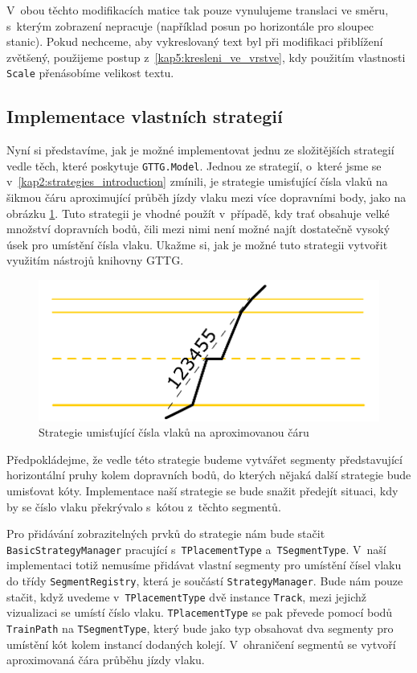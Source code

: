 V~obou těchto modifikacích matice tak pouze vynulujeme translaci ve směru, s~kterým zobrazení nepracuje (například posun po horizontále pro sloupec stanic). Pokud nechceme, aby vykreslovaný text byl při modifikaci přiblížení zvětšený, použijeme postup z~\ref{kap5:kresleni_ve_vrstve}, kdy použitím vlastnosti \texttt{Scale} přenásobíme velikost textu.

\subsection*{Implementace vlastních strategií}
Nyní si představíme, jak je možné implementovat jednu ze složitějších strategií vedle těch, které poskytuje \texttt{GTTG.Model}. Jednou ze strategií, o~které jsme se v~\ref{kap2:strategies_introduction} zmínili, je strategie umisťující čísla vlaků na šikmou čáru aproximující průběh jízdy vlaku mezi více dopravními body, jako na obrázku \ref{fig:kap5:strategy_aproximation}. Tuto strategii je vhodné použít v~případě, kdy trať obsahuje velké množství dopravních bodů, čili mezi nimi není možné najít dostatečně vysoký úsek pro umístění čísla vlaku. Ukažme si, jak je možné tuto strategii vytvořit využitím nástrojů knihovny GTTG.

\begin{figure}[!hbt]
	\centering
	\includegraphics[width=\textwidth]{../img/kap5_approx_line}
	\caption{Strategie umisťující čísla vlaků na aproximovanou čáru}
	\label{fig:kap5:strategy_aproximation}
\end{figure}

Předpokládejme, že vedle této strategie budeme vytvářet segmenty představující horizontální pruhy kolem dopravních bodů, do kterých nějaká další strategie bude umisťovat kóty. Implementace naší strategie se bude snažit předejít situaci, kdy by se číslo vlaku překrývalo s~kótou z~těchto segmentů.

Pro přidávání zobrazitelných prvků do strategie nám bude stačit \linebreak \texttt{BasicStrategyManager} pracující s~\texttt{TPlacementType} a~\texttt{TSegmentType}. V~naší implementaci totiž nemusíme přidávat vlastní segmenty pro umístění čísel vlaku do třídy \texttt{SegmentRegistry}, která je součástí \texttt{StrategyManager}. Bude nám pouze stačit, když uvedeme v~\texttt{TPlacementType} dvě instance \texttt{Track}, mezi jejichž vizualizaci se umístí číslo vlaku. \texttt{TPlacementType} se pak převede pomocí bodů \texttt{TrainPath} na \texttt{TSegmentType}, který bude jako typ obsahovat dva segmenty pro umístění kót kolem instancí dodaných kolejí. V~ohraničení segmentů se vytvoří aproximovaná čára průběhu jízdy vlaku.

